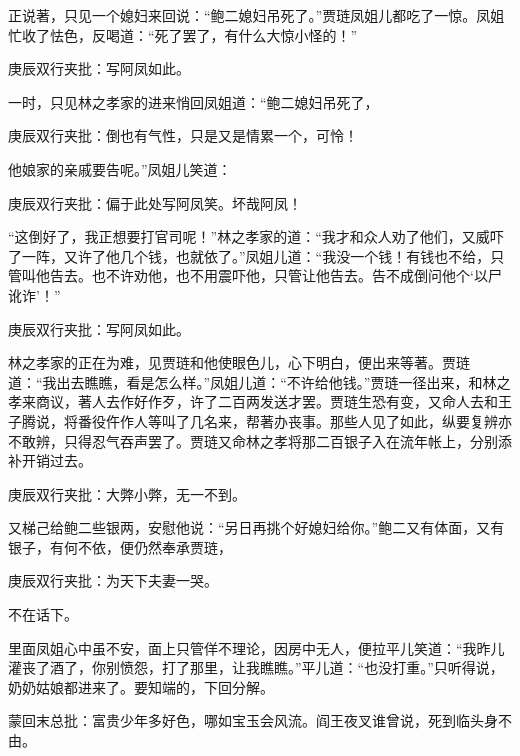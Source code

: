 \begin{parag}
    正说著，只见一个媳妇来回说：“鲍二媳妇吊死了。”贾琏凤姐儿都吃了一惊。凤姐忙收了怯色，反喝道：“死了罢了，有什么大惊小怪的！”\begin{note}庚辰双行夹批：写阿凤如此。\end{note}一时，只见林之孝家的进来悄回凤姐道：“鲍二媳妇吊死了，\begin{note}庚辰双行夹批：倒也有气性，只是又是情累一个，可怜！\end{note}他娘家的亲戚要告呢。”凤姐儿笑道：\begin{note}庚辰双行夹批：偏于此处写阿凤笑。坏哉阿凤！\end{note}“这倒好了，我正想要打官司呢！”林之孝家的道：“我才和众人劝了他们，又威吓了一阵，又许了他几个钱，也就依了。”凤姐儿道：“我没一个钱！有钱也不给，只管叫他告去。也不许劝他，也不用震吓他，只管让他告去。告不成倒问他个‘以尸讹诈’！”\begin{note}庚辰双行夹批：写阿凤如此。\end{note}林之孝家的正在为难，见贾琏和他使眼色儿，心下明白，便出来等著。贾琏道：“我出去瞧瞧，看是怎么样。”凤姐儿道：“不许给他钱。”贾琏一径出来，和林之孝来商议，著人去作好作歹，许了二百两发送才罢。贾琏生恐有变，又命人去和王子腾说，将番役仵作人等叫了几名来，帮著办丧事。那些人见了如此，纵要复辨亦不敢辨，只得忍气吞声罢了。贾琏又命林之孝将那二百银子入在流年帐上，分别添补开销过去。\begin{note}庚辰双行夹批：大弊小弊，无一不到。\end{note}又梯己给鲍二些银两，安慰他说：“另日再挑个好媳妇给你。”鲍二又有体面，又有银子，有何不依，便仍然奉承贾琏，\begin{note}庚辰双行夹批：为天下夫妻一哭。\end{note}不在话下。
\end{parag}


\begin{parag}
    里面凤姐心中虽不安，面上只管佯不理论，因房中无人，便拉平儿笑道：“我昨儿灌丧了酒了，你别愤怨，打了那里，让我瞧瞧。”平儿道：“也没打重。”只听得说，奶奶姑娘都进来了。要知端的，下回分解。
\end{parag}


\begin{parag}
    \begin{note}蒙回末总批：富贵少年多好色，哪如宝玉会风流。阎王夜叉谁曾说，死到临头身不由。\end{note}
\end{parag}
